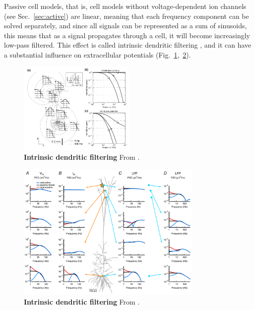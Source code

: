 \documentclass[preprint,11pt,authoryear]{elsarticle}
\begin{document}
Passive cell models, that is, cell models without voltage-dependent ion channels (see Sec.~\ref{sec:active}) are linear, meaning that each frequency component can be solved separately, and since all signals can be represented as a sum of sinusoids, this means that as a signal propagates through a cell, it will become increasingly low-pass filtered. This effect is called intrinsic dendritic filtering \citep{Linden2010}, and it can have a substantial influence on extracellular potentials (Fig.~\ref{fig:intrinsic},~\ref{fig:intrinsic2}).
\begin{figure}[ht!]
\begin{center}
\includegraphics[width=0.5\textwidth]{intrinsic_dendritic_filtering.png}
\end{center}
\caption{\textbf{Intrinsic dendritic filtering} From \cite{Linden2010}.}
\label{fig:intrinsic}
\end{figure}

\begin{figure}[ht!]
\begin{center}
\includegraphics[width=0.8\textwidth]{hay_intrinsic.png}
\end{center}
\caption{\textbf{Intrinsic dendritic filtering} From \cite{Ness2016}.}
\label{fig:intrinsic2}
\end{figure}
\end{document}
